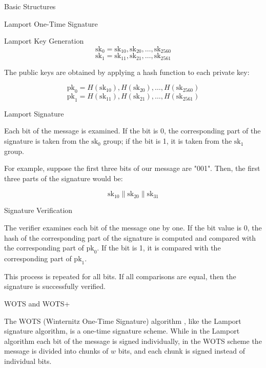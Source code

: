 \documentclass [version=submission]{iacrcc}
\begin{document}
\begin{section}{Basic Structures}{\label{sec1}}
\begin{subsection}{Lamport One-Time Signature}
\begin{subsubsection}{Lamport Key Generation}
    \[
    \text{sk}_0 = \text{sk}_{10}, \text{sk}_{20}, \ldots, \text{sk}_{2560}
    \]
    \[
    \text{sk}_1 = \text{sk}_{11}, \text{sk}_{21}, \ldots, \text{sk}_{2561}
    \]
    
    The public keys are obtained by applying a hash function to each private key:
    
    \[
    \text{pk}_0 = H(\text{sk}_{10}), H(\text{sk}_{20}), \ldots, H(\text{sk}_{2560})
    \]
    \[
    \text{pk}_1 = H(\text{sk}_{11}), H(\text{sk}_{21}), \ldots, H(\text{sk}_{2561}) \]
    
\end{subsubsection}

\begin{subsubsection}{Lamport Signature}

    Each bit of the message is examined. If the bit is 0, the corresponding part of the signature is taken from the \(\text{sk}_0\) group; if the bit is 1, it is taken from the \(\text{sk}_1\) group.

    For example, suppose the first three bits of our message are "001". Then, the first three parts of the signature would be:

    \[
    \text{sk}_{10} \| \text{sk}_{20} \| \text{sk}_{31}
    \]
    
\end{subsubsection}

\begin{subsubsection}{Signature Verification}

    The verifier examines each bit of the message one by one. If the bit value is 0, the hash of the corresponding part of the signature is computed and compared with the corresponding part of \(\text{pk}_0\). If the bit is 1, it is compared with the corresponding part of \(\text{pk}_1\).

    This process is repeated for all bits. If all comparisons are equal, then the signature is successfully verified.
    
\end{subsubsection}
    
\end{subsection}

\begin{subsection}{WOTS and WOTS+}

    The WOTS (Winternitz One-Time Signature) algorithm \cite{buchmann2013security}, like the Lamport signature algorithm, is a one-time signature scheme. While in the Lamport algorithm each bit of the message is signed individually, in the WOTS scheme the message is divided into chunks of \( w \) bits, and each chunk is signed instead of individual bits. 


\end{subsection}
\end{section}
\end{document}
